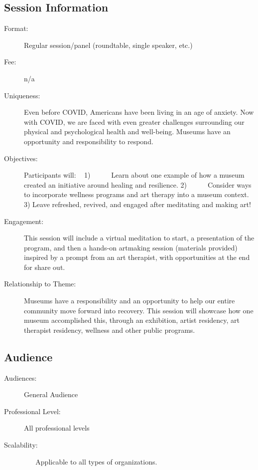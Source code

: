 \documentclass{report}
\begin{document}
              \subsection*{Session Information}
                \begin{description}
                  \item [Format:] Regular session/panel (roundtable, single speaker, etc.)
							    
								  \item [Fee:]n/a
							     
							    \item [Uniqueness:]Even before COVID, Americans have been living in an age of anxiety. Now with COVID, we are faced with even greater challenges surrounding our physical and psychological health and well-being. Museums have an opportunity and responsibility to respond.
							    \item [Objectives:]Participants will:
 
1)      Learn about one example of how a museum created an initiative around healing and resilience.
2)      Consider ways to incorporate wellness programs and art therapy into a museum context. 
3)    Leave refreshed, revived, and engaged after meditating and making art!
							    \item [Engagement:]This session will include a virtual meditation to start, a presentation of the program, and then a hands-on artmaking session (materials provided) inspired by a prompt from an art therapist, with opportunities at the end for share out.
							    \item [Relationship to Theme:]Museums have a responsibility and an opportunity to help our entire community move forward into recovery. This session will showcase how one museum accomplished this, through an exhibition, artist residency, art therapist residency, wellness and other public programs.
							    
                \end{description}
              \subsection*{Audience}
                \begin{description}
                  \item [Audiences:]General Audience~
                  \item[Professional Level:]All professional levels~
                \item[Scalability:]    
 
Applicable to all types of organizations. 
  

							
              \end{description}
\end{document}
